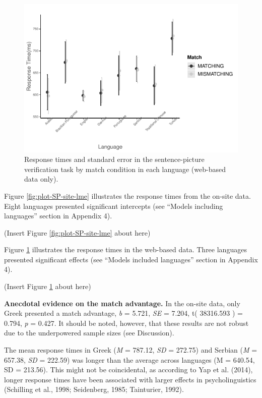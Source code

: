 \documentclass[
  man]{apa6}
\begin{document}
\begin{figure}
\centering
\includegraphics{Stage2_Report_0228_files/figure-latex/plot-SP-osweb-lme-1.pdf}
\caption{\label{fig:plot-SP-osweb-lme}Response times and standard error in the sentence-picture verification task by match condition in each language (web-based data only).}
\end{figure}

Figure \ref{fig:plot-SP-site-lme} illustrates the response times from the on-site data. Eight languages presented significant intercepts (see ``Models including languages'' section in Appendix 4).

(Insert Figure \ref{fig:plot-SP-site-lme} about here)

Figure \ref{fig:plot-SP-osweb-lme} illustrates the response times in the web-based data. Three languages presented significant effects (see ``Models included languages'' section in Appendix 4).

(Insert Figure \ref{fig:plot-SP-osweb-lme} about here)

\textbf{Anecdotal evidence on the match advantage.} In the on-site data, only Greek presented a match advantage, \emph{b} = 5.721, \emph{SE} = 7.204, t( 38316.593 ) = 0.794, \emph{p} = 0.427. It should be noted, however, that these results are not robust due to the underpowered sample sizes (see Discussion).

The mean response times in Greek (\emph{M} = 787.12, \emph{SD} = 272.75) and Serbian (\emph{M} = 657.38, \emph{SD} = 222.59) was longer than the average across languages (M = 640.54, SD = 213.56). This might not be coincidental, as according to Yap et al. (2014), longer response times have been associated with larger effects in psycholinguistics (Schilling et al., 1998; Seidenberg, 1985; Tainturier, 1992).
\end{document}
